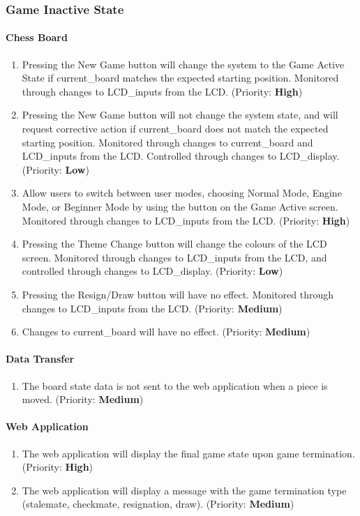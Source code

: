 \documentclass[12pt]{article}
\begin{document}
\subsubsection{Game Inactive State}
\paragraph{Chess Board}
\begin{enumerate}[{GI}1., leftmargin=2\parindent]
    \item Pressing the New Game button will change the system to the Game Active State if current\_board matches the expected starting position. Monitored through changes to LCD\_inputs from the LCD. (Priority: \textbf{High}) 
    \item Pressing the New Game button will not change the system state, and will request corrective action if current\_board does not match the expected starting position. Monitored through changes to current\_board and LCD\_inputs from the LCD. Controlled through changes to LCD\_display. (Priority: \textbf{Low})
    \item Allow users to switch between user modes, choosing Normal Mode, Engine Mode, or Beginner Mode by using the button on the Game Active screen. Monitored through changes to LCD\_inputs from the LCD. (Priority: \textbf{High}) 
    \item Pressing the Theme Change button will change the colours of the LCD screen. Monitored through changes to LCD\_inputs from the LCD, and controlled through changes to LCD\_display. (Priority: \textbf{Low}) 
    \item Pressing the Resign/Draw button will have no effect. Monitored through changes to LCD\_inputs from the LCD. (Priority: \textbf{Medium}) 
    \item Changes to current\_board will have no effect. (Priority: \textbf{Medium}) 
\end{enumerate}

\paragraph{Data Transfer}
\begin{enumerate}[{GI}1., leftmargin=2\parindent, resume]
    \item The board state data is not sent to the web application when a piece is moved. (Priority: \textbf{Medium}) 
\end{enumerate}

\paragraph{Web Application}
\begin{enumerate}[{GI}1., leftmargin=2\parindent, resume]
    \item The web application will display the final game state upon game termination. (Priority: \textbf{High}) 
    \item The web application will display a message with the game termination type (stalemate, checkmate, resignation, draw). (Priority: \textbf{Medium}) 
\end{enumerate}
\end{document}
